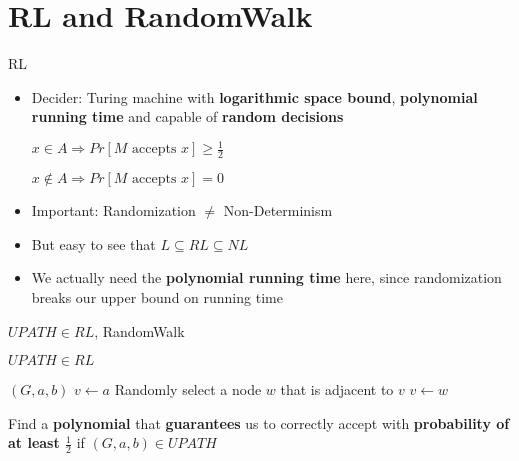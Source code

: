 \section{RL and RandomWalk}\label{rl-and-randomwalk}

\begin{frame}{RL}

\begin{itemize}
\item
  Decider: Turing machine with \textbf{logarithmic space bound},
  \textbf{polynomial running time} and capable of \textbf{random
  decisions}

  $x \in A \Rightarrow Pr[M \text{ accepts } x] \geq \frac{1}{2}$

  $x \not \in A \Rightarrow Pr[M \text{ accepts } x] = 0$
\item
  Important: Randomization $\not =$ Non-Determinism
\item
  But easy to see that $L \subseteq RL \subseteq NL$
\item
  We actually need the \textbf{polynomial running time} here, since
  randomization breaks our upper bound on running time
\end{itemize}

\end{frame}

\begin{frame}{$UPATH \in RL$, RandomWalk}

\begin{theorem}
$UPATH \in RL$
\end{theorem}

\renewcommand{\algorithmicrequire}{\textbf{Input:}}
\renewcommand{\algorithmicensure}{\textbf{Output:}}

\begin{algorithmic}
\Require $(G, a, b)$
\State $v \gets a$
    \State Randomly select a node $w$ that is adjacent to $v$
    \State $v \gets w$
    \EndIf
\EndFor
{}
\end{algorithmic}

Find a \textbf{polynomial}  that
\textbf{guarantees} us to correctly accept with \textbf{probability of
at least $\frac{1}{2}$} if $(G, a, b) \in UPATH$

\end{frame}

